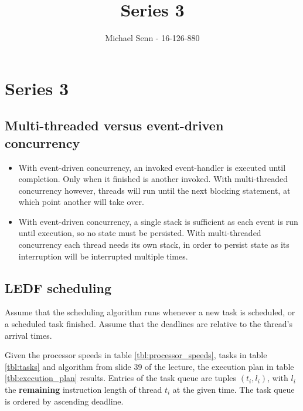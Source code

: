 \documentclass[a4paper]{scrreprt}
\title{Series 3}
\author{Michael Senn \maillink{michael.senn@students.unibe.ch} - 16-126-880}
\date{\printdate}
\begin{document}
\maketitle


\setcounter{chapter}{2}

\chapter{Series 3}

\section{Multi-threaded versus event-driven concurrency}

\begin{itemize}
		\item With event-driven concurrency, an invoked event-handler is
				executed until completion. Only when it finished is another
				invoked. With multi-threaded concurrency however, threads will
				run until the next blocking statement, at which point another
				will take over.
		\item With event-driven concurrency, a single stack is sufficient as
				each event is run until execution, so no state must be
				persisted. With multi-threaded concurrency each thread needs
				its own stack, in order to persist state as its interruption
				will be interrupted multiple times.
\end{itemize}

\section{LEDF scheduling}

Assume that the scheduling algorithm runs whenever a new task is scheduled, or
a scheduled task finished. Assume that the deadlines are relative to the
thread's arrival times.

Given the processor speeds in table \ref{tbl:processor_speeds}, tasks in table
\ref{tbl:tasks} and algorithm from slide 39 of the lecture, the execution plan
in table \ref{tbl:execution_plan} results. Entries of the task queue are tuples
$(t_i, l_i)$, with $l_i$ the \textbf{remaining} instruction length of thread
$t_i$ at the given time. The task queue is ordered by ascending deadline.
\end{document}
